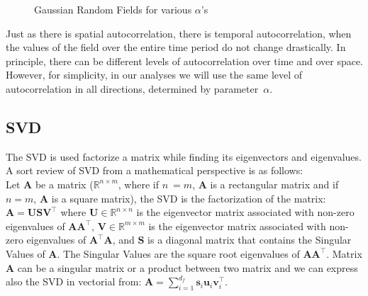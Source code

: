 \documentclass[ijgi,article,submit,moreauthors,pdftex,10pt,a4paper]{Definitions/mdpi}
\def\A{{\mathbf A}}
\def\U{{\mathbf U}}
\def\V{{\mathbf V}}
\def\S{{\mathbf S}}
\def\u{{\mathbf u}}
\def\v{{\mathbf v}}
\def\s{{\mathbf s}}
\begin{document}
\begin{figure}[H]
\hspace{8mm}
\caption{Gaussian Random Fields for various $\alpha$'s}
\label{fig:GaussianRandomField}
\end{figure}

Just as there is spatial autocorrelation, there is temporal autocorrelation, when the values of the field over the entire time period do not change
drastically. In principle, there can be different levels of autocorrelation over time and over space. However, for simplicity, in our analyses we will
use the same level of autocorrelation in all directions, determined by parameter~$\alpha$.

\subsection{SVD}
\label{svd}
The SVD is used factorize a matrix while finding its eigenvectors and eigenvalues. A sort review of SVD from a mathematical perspective is as follows: \\
Let $\A$ be a matrix ($\mathbb{R}^{n \times m}$, where if $n~=m$, $\A$ is a rectangular matrix and if $n=m$, $\A$ is a square matrix), the SVD is the
factorization of the matrix: $\A=\U\S\V^{\top}$ where $\U \in \mathbb{R}^{n \times n}$ is the eigenvector matrix associated with non-zero eigenvalues
of $\A\A^{\top}$, $\V \in \mathbb{R}^{m \times m}$ is the eigenvector matrix associated with non-zero eigenvalues of $\A^{\top}\A$, and $\S$ is a
diagonal matrix that contains the Singular Values of $\A$. The Singular Values are the square root eigenvalues of $\A\A^{\top}$. Matrix $\A$ can be a
singular matrix or a product between two matrix and we can express also the SVD in vectorial from: $\A=\sum_{i=1}^{d_f} \s_i \u_i \v_i^{\top}$.
\end{document}
